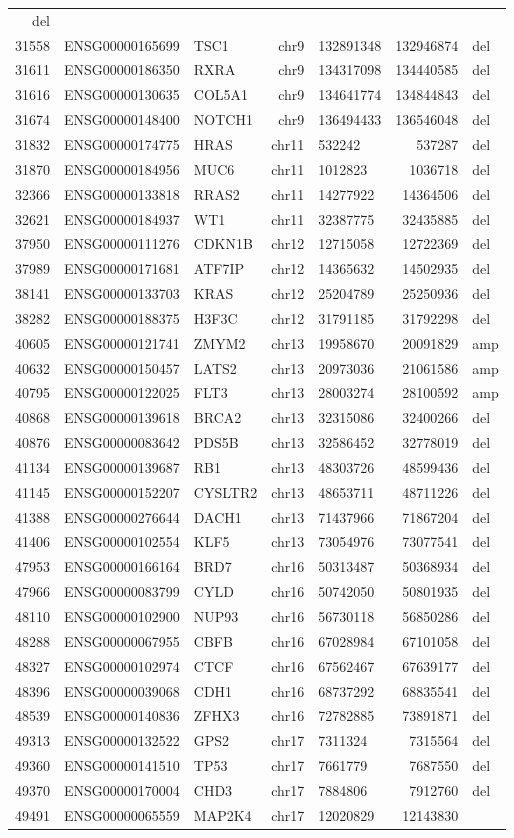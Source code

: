 \documentclass[]{article}
\begin{document}
\begin{longtable}[]{@{}rrlrlrl@{}}
del\tabularnewline
31558 & ENSG00000165699 & TSC1 & chr9 & 132891348 & 132946874 &
del\tabularnewline
31611 & ENSG00000186350 & RXRA & chr9 & 134317098 & 134440585 &
del\tabularnewline
31616 & ENSG00000130635 & COL5A1 & chr9 & 134641774 & 134844843 &
del\tabularnewline
31674 & ENSG00000148400 & NOTCH1 & chr9 & 136494433 & 136546048 &
del\tabularnewline
31832 & ENSG00000174775 & HRAS & chr11 & 532242 & 537287 &
del\tabularnewline
31870 & ENSG00000184956 & MUC6 & chr11 & 1012823 & 1036718 &
del\tabularnewline
32366 & ENSG00000133818 & RRAS2 & chr11 & 14277922 & 14364506 &
del\tabularnewline
32621 & ENSG00000184937 & WT1 & chr11 & 32387775 & 32435885 &
del\tabularnewline
37950 & ENSG00000111276 & CDKN1B & chr12 & 12715058 & 12722369 &
del\tabularnewline
37989 & ENSG00000171681 & ATF7IP & chr12 & 14365632 & 14502935 &
del\tabularnewline
38141 & ENSG00000133703 & KRAS & chr12 & 25204789 & 25250936 &
del\tabularnewline
38282 & ENSG00000188375 & H3F3C & chr12 & 31791185 & 31792298 &
del\tabularnewline
40605 & ENSG00000121741 & ZMYM2 & chr13 & 19958670 & 20091829 &
amp\tabularnewline
40632 & ENSG00000150457 & LATS2 & chr13 & 20973036 & 21061586 &
amp\tabularnewline
40795 & ENSG00000122025 & FLT3 & chr13 & 28003274 & 28100592 &
amp\tabularnewline
40868 & ENSG00000139618 & BRCA2 & chr13 & 32315086 & 32400266 &
del\tabularnewline
40876 & ENSG00000083642 & PDS5B & chr13 & 32586452 & 32778019 &
del\tabularnewline
41134 & ENSG00000139687 & RB1 & chr13 & 48303726 & 48599436 &
del\tabularnewline
41145 & ENSG00000152207 & CYSLTR2 & chr13 & 48653711 & 48711226 &
del\tabularnewline
41388 & ENSG00000276644 & DACH1 & chr13 & 71437966 & 71867204 &
del\tabularnewline
41406 & ENSG00000102554 & KLF5 & chr13 & 73054976 & 73077541 &
del\tabularnewline
47953 & ENSG00000166164 & BRD7 & chr16 & 50313487 & 50368934 &
del\tabularnewline
47966 & ENSG00000083799 & CYLD & chr16 & 50742050 & 50801935 &
del\tabularnewline
48110 & ENSG00000102900 & NUP93 & chr16 & 56730118 & 56850286 &
del\tabularnewline
48288 & ENSG00000067955 & CBFB & chr16 & 67028984 & 67101058 &
del\tabularnewline
48327 & ENSG00000102974 & CTCF & chr16 & 67562467 & 67639177 &
del\tabularnewline
48396 & ENSG00000039068 & CDH1 & chr16 & 68737292 & 68835541 &
del\tabularnewline
48539 & ENSG00000140836 & ZFHX3 & chr16 & 72782885 & 73891871 &
del\tabularnewline
49313 & ENSG00000132522 & GPS2 & chr17 & 7311324 & 7315564 &
del\tabularnewline
49360 & ENSG00000141510 & TP53 & chr17 & 7661779 & 7687550 &
del\tabularnewline
49370 & ENSG00000170004 & CHD3 & chr17 & 7884806 & 7912760 &
del\tabularnewline
49491 & ENSG00000065559 & MAP2K4 & chr17 & 12020829 & 12143830 &

\end{longtable}
\end{document}

